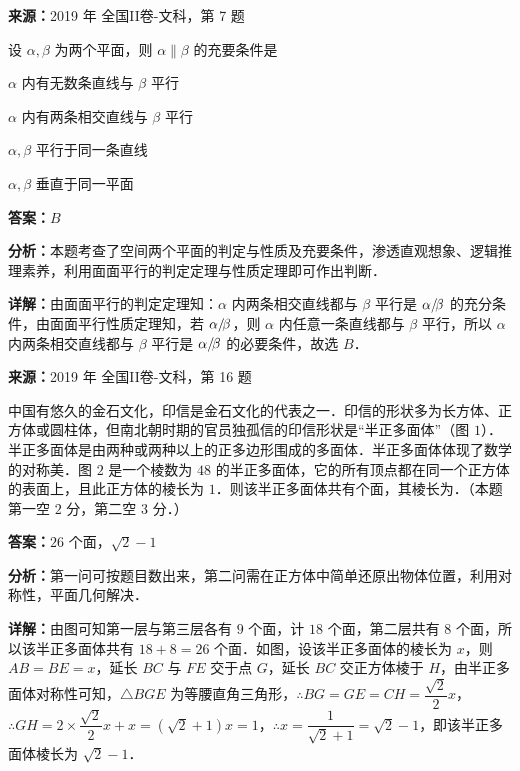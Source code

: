 \begin{question}[points=5]
\textbf{来源：}2019 年 全国II卷-文科，第 7 题\par
设 $\alpha,\beta$ 为两个平面，则 $\alpha\parallel\beta$ 的充要条件是
\begin{choices}
  \item $\alpha$ 内有无数条直线与 $\beta$ 平行
  \item $\alpha$ 内有两条相交直线与 $\beta$ 平行
  \item $\alpha,\beta$ 平行于同一条直线
  \item $\alpha,\beta$ 垂直于同一平面
\end{choices}
\begin{solution}
\textbf{答案：}$B$

\textbf{分析：}本题考查了空间两个平面的判定与性质及充要条件，渗透直观想象、逻辑推理素养，利用面面平行的判定定理与性质定理即可作出判断．

\textbf{详解：}由面面平行的判定定理知：$\alpha$ 内两条相交直线都与 $\beta$ 平行是 $\alpha/\!\/\beta$ 的充分条件，由面面平行性质定理知，若 $\alpha/\!\/\beta$，则 $\alpha$ 内任意一条直线都与 $\beta$ 平行，所以 $\alpha$ 内两条相交直线都与 $\beta$ 平行是 $\alpha/\!\/\beta$ 的必要条件，故选 $B$．
\end{solution}
\end{question}

\begin{question}[points=5]
\textbf{来源：}2019 年 全国II卷-文科，第 16 题\par
中国有悠久的金石文化，印信是金石文化的代表之一．印信的形状多为长方体、正方体或圆柱体，但南北朝时期的官员独孤信的印信形状是“半正多面体”（图 $1$）．半正多面体是由两种或两种以上的正多边形围成的多面体．半正多面体体现了数学的对称美．图 $2$ 是一个棱数为 $48$ 的半正多面体，它的所有顶点都在同一个正方体的表面上，且此正方体的棱长为 $1$．则该半正多面体共有个面，其棱长为．（本题第一空 $2$ 分，第二空 $3$ 分．）
\fillin[{$26$ 个面，$\sqrt{2}-1$}]
\begin{solution}
\textbf{答案：}$26$ 个面，$\sqrt{2}-1$

\textbf{分析：}第一问可按题目数出来，第二问需在正方体中简单还原出物体位置，利用对称性，平面几何解决．

\textbf{详解：}由图可知第一层与第三层各有 $9$ 个面，计 $18$ 个面，第二层共有 $8$ 个面，所以该半正多面体共有 $18+8=26$ 个面．如图，设该半正多面体的棱长为 $x$，则 $AB=BE=x$，延长 $BC$ 与 $FE$ 交于点 $G$，延长 $BC$ 交正方体棱于 $H$，由半正多面体对称性可知，$\triangle BGE$ 为等腰直角三角形，$\therefore BG=GE=CH=\dfrac{\sqrt{2}}{2}x$，$\therefore GH=2\times\dfrac{\sqrt{2}}{2}x+x=(\sqrt{2}+1)x=1$，$\therefore x=\dfrac{1}{\sqrt{2}+1}=\sqrt{2}-1$，即该半正多面体棱长为 $\sqrt{2}-1$．
\end{solution}
\end{question}

